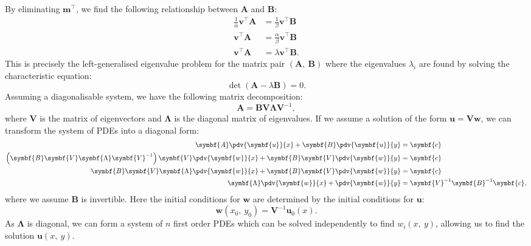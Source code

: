 \documentclass{article}
\theoremstyle{definition}
\begin{document}
By eliminating \(\symbf{m}^\top\), we find the following relationship
between \(\symbf{A}\) and \(\symbf{B}\):
\begin{align*}
    \frac{1}{\alpha} \symbf{v}^\top \symbf{A} & = \frac{1}{\beta} \symbf{v}^\top \symbf{B}      \\
    \symbf{v}^\top \symbf{A}                  & = \frac{\alpha}{\beta} \symbf{v}^\top \symbf{B} \\
    \symbf{v}^\top \symbf{A}                  & = \lambda \symbf{v}^\top \symbf{B}.
\end{align*}
This is precisely the left-generalised eigenvalue problem for the matrix
pair \(\left( \symbf{A},\: \symbf{B} \right)\) where the eigenvalues
\(\lambda_i\) are found by solving the characteristic equation:
\begin{equation*}
    \det{\left( \symbf{A} - \lambda \symbf{B} \right)} = 0.
\end{equation*}
Assuming a diagonalisable system, we have the following matrix
decomposition:
\begin{equation*}
    \symbf{A} = \symbf{B} \symbf{V} \symbf{\Lambda} \symbf{V}^{-1},
\end{equation*}
where \(\symbf{V}\) is the matrix of eigenvectors and \(\symbf{\Lambda}\)
is the diagonal matrix of eigenvalues. If we assume a solution of the
form \(\symbf{u} = \symbf{V} \symbf{w}\), we can transform the system
of PDEs into a diagonal form:
\begin{align*}
    \symbf{A} \pdv{\symbf{u}}{x} + \symbf{B} \pdv{\symbf{u}}{y}                                                                             & = \symbf{c}                                \\
    \left( \symbf{B} \symbf{V} \symbf{\Lambda} \symbf{V}^{-1} \right) \symbf{V} \pdv{\symbf{w}}{x} + \symbf{B} \symbf{V} \pdv{\symbf{w}}{y} & = \symbf{c}                                \\
    \symbf{B} \symbf{V} \symbf{\Lambda} \pdv{\symbf{w}}{x} + \symbf{B} \symbf{V} \pdv{\symbf{w}}{y}                                         & = \symbf{c}                                \\
    \symbf{\Lambda} \pdv{\symbf{w}}{x} + \pdv{\symbf{w}}{y}                                                                                 & = \symbf{V}^{-1} \symbf{B}^{-1} \symbf{c},
\end{align*}
where we assume \(\symbf{B}\) is invertible. Here the initial conditions
for \(\symbf{w}\) are determined by the initial conditions for
\(\symbf{u}\):
\begin{equation*}
    \symbf{w}\left( x_0,\: y_0 \right) = \symbf{V}^{-1} \symbf{u}_0\left( x \right).
\end{equation*}
As \(\symbf{\Lambda}\) is diagonal, we can form a system of \(n\) first
order PDEs which can be solved independently to find \(w_i\left( x,\: y \right)\),
allowing us to find the solution \(\symbf{u}\left( x,\: y \right)\).
\end{document}
